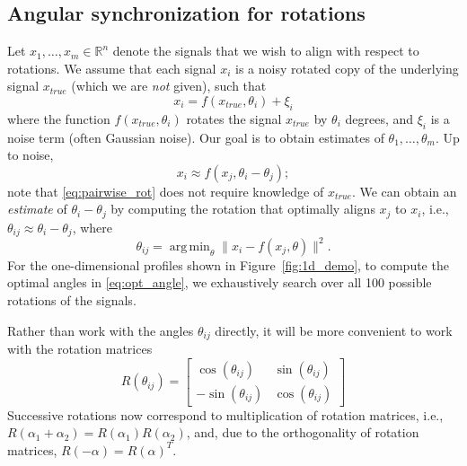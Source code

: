 \documentclass{pnastwo}
\DeclareMathOperator*{\argmin}{arg\,min}
\begin{document}
\begin{article}




\begin{materials}

\section{Angular synchronization for rotations\cite{singer2011angular}}

Let $x_1, \dots, x_m \in \mathbb{R}^n$ denote the signals that we wish to align with respect to rotations.
%
We assume that each signal $x_i$ is a noisy rotated copy of the underlying signal $x_{true}$ (which we are {\em not} given), such that 
\begin{equation}
x_i = f(x_{true}, \theta_i) + \xi_i
\end{equation}
where the function $f(x_{true}, \theta_i)$ rotates the signal $x_{true}$ by $\theta_i$ degrees, and $\xi_i$ is a noise term (often Gaussian noise). 
%
Our goal is to obtain estimates of $\theta_1, \dots, \theta_m$.
%
Up to noise, 
\begin{equation} \label{eq:pairwise_rot}
x_i \approx f(x_j, \theta_i - \theta_j) ;
\end{equation}
 note that \eqref{eq:pairwise_rot} does not require knowledge of $x_{true}$.
%
We can obtain an {\em estimate} of $\theta_i - \theta_j$ by computing the rotation that optimally aligns $x_j$ to $x_i$, 
i.e., $\theta_{ij} \approx \theta_i - \theta_j$, where
%
\begin{equation} \label{eq:opt_angle}
\theta_{ij} = \argmin_{\theta} \|x_i - f(x_j, \theta)\|^2.
\end{equation}
%
For the one-dimensional profiles shown in Figure~\ref{fig:1d_demo}, to compute the optimal angles in \eqref{eq:opt_angle}, we exhaustively search over all 100 possible rotations of the signals. 

Rather than work with the angles $\theta_{ij}$ directly, it will be more convenient to work with the rotation matrices 
\begin{equation} \label{eq:R_theta}
R(\theta_{ij}) = \begin{bmatrix}
\cos(\theta_{ij}) & \sin(\theta_{ij}) \\
-\sin(\theta_{ij}) & \cos(\theta_{ij})
\end{bmatrix}
\end{equation}
%
Successive rotations now correspond to multiplication of rotation matrices, i.e., 
$R(\alpha_1 + \alpha_2) = R(\alpha_1) R(\alpha_2)$,
and, due to the orthogonality of rotation matrices, $R(-\alpha) = R(\alpha)^T$.


\end{materials}
\end{article}
\end{document}
